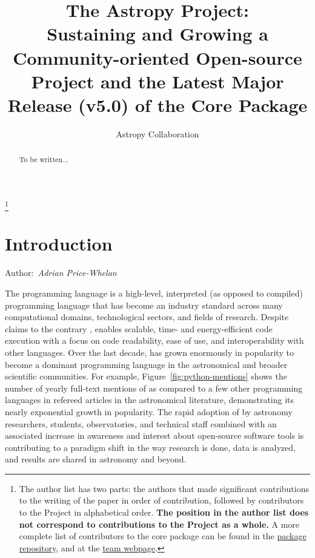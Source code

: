 \documentclass[modern]{aastex631}
\newcommand{\secauthor}[1]{{\color{blue}Author:~\textit{#1}}}
\begin{document}
\draft{\today}

\title{The Astropy Project: \\
       Sustaining and Growing a Community-oriented Open-source Project and
       the Latest Major Release (v5.0) of the Core Package}


\author{Astropy Collaboration}
\noaffiliation
{\let\thefootnote\relax\footnote{{The author list has two parts: the authors that made significant contributions to the writing of the paper in order of contribution, followed by contributors to the \astropy Project in alphabetical order. \textbf{The position in the author list does not correspond to contributions to the \astropy Project as a whole.} A more complete list of contributors to the core package can be found in the \href{https://github.com/astropy/astropy/graphs/contributors}{package repository}, and at the \href{http://www.astropy.org/team.html}{\astropy team webpage}.}}}

% 

\begin{abstract}

    To be written...

\end{abstract}



\section{Introduction} \label{sec:intro}

\secauthor{Adrian Price-Whelan}

The \python programming language is a high-level, interpreted (as opposed to
compiled) programming language that has become an industry standard across many
computational domains, technological sectors, and fields of research.
Despite claims to the contrary \citep{Portegies-Zwart:2020}, \python enables
scalable, time- and energy-efficient code execution \citep[e.g.,][]{Augier:2021}
with a focus on code readability, ease of use, and interoperability with other
languages.
Over the last decade, \python has grown enormously in popularity to become a
dominant programming language in the astronomical and broader scientific
communities.
For example, Figure~\ref{fig:python-mentions} shows the number of yearly
full-text mentions of \python as compared to a few other programming languages
in refereed articles in the astronomical literature, demonstrating its nearly
exponential growth in popularity.
The rapid adoption of \python by astronomy researchers, students, observatories,
and technical staff combined with an associated increase in awareness and
interest about open-source software tools is contributing to a paradigm shift in
the way research is done, data is analyzed, and results are shared in astronomy
and beyond.
\end{document}
